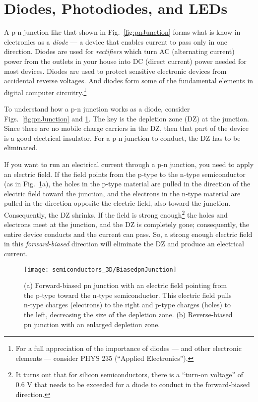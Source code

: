 \section{Diodes, Photodiodes, and LEDs}
\label{sec:diodes}

A p-n junction like that shown in Fig.~\ref{fig:pnJunction} forms what
is know in electronics as a {\it diode} --- a device that enables
current to pass only in one direction.  Diodes are used for
{\it rectifiers} which turn AC (alternating current) power from the
outlets in your house into DC (direct current) power needed for most
devices.  Diodes are used to protect sensitive electronic devices from
accidental reverse voltages.  And diodes form some of the fundamental
elements in digital computer circuitry.\footnote{For a full appreciation of
the importance of diodes --- and other electronic elements --- consider
PHYS 235 (``Applied Electronics'').}

To understand how a p-n junction works as a diode, consider 
Figs.~\ref{fig:pnJunction} and \ref{fig:BiasedpnJunction}.  The
key is the depletion zone (DZ) at the junction. Since there are no 
mobile charge carriers in the DZ, then that part of the device
is a good electrical insulator. For a p-n junction to conduct, the DZ has to
be eliminated.

If you want to run an electrical 
current through a p-n junction, you need to apply an electric field.
If the field points from the p-type to the n-type semiconductor
(as in Fig.~\ref{fig:BiasedpnJunction}a), the holes in the
p-type material are pulled in the direction of the electric field
toward the junction, and the electrons in the n-type material are
pulled in the direction opposite the electric field, also toward
the junction.  Consequently, the DZ shrinks.
If the field is strong enough\footnote{It turns out that
for silicon semiconductors, there is a ``turn-on voltage'' of
0.6 V that needs to be exceeded for a diode to conduct in the
forward-biased direction.} the holes and electrons meet at the junction,
and the DZ is completely gone; consequently, the entire device
conducts and the current can pass. So, a strong enough electric field
in this {\it forward-biased} direction will eliminate the DZ and
produce an electrical current.

\begin{figure}
\begin{center}
\texttt{[image: semiconductors\_3D/BiasedpnJunction]}
\end{center} 
\caption{(a) Forward-biased pn junction with an electric field
pointing from the p-type toward the n-type semiconductor. This electric
field pulls n-type charges (electrons) to the right and p-type charges
(holes) to the left, decreasing the size of the depletion zone.
(b) Reverse-biased pn junction with an enlarged depletion zone.
} 
\label{fig:BiasedpnJunction} 
\end{figure}


